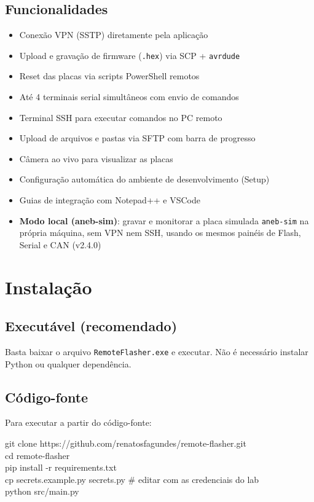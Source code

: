 \documentclass[12pt,a4paper]{article}
\begin{document}
\subsection{Funcionalidades}

\begin{itemize}[nosep]
  \item Conexão VPN (SSTP) diretamente pela aplicação
  \item Upload e gravação de firmware (\texttt{.hex}) via SCP + \texttt{avrdude}
  \item Reset das placas via scripts PowerShell remotos
  \item Até 4 terminais serial simultâneos com envio de comandos
  \item Terminal SSH para executar comandos no PC remoto
  \item Upload de arquivos e pastas via SFTP com barra de progresso
  \item Câmera ao vivo para visualizar as placas
  \item Configuração automática do ambiente de desenvolvimento (Setup)
  \item Guias de integração com Notepad++ e VSCode
  \item \textbf{Modo local (aneb-sim)}: gravar e monitorar a placa
        simulada \texttt{aneb-sim} na própria máquina, sem VPN nem SSH,
        usando os mesmos painéis de Flash, Serial e CAN (v2.4.0)
\end{itemize}

\section{Instalação}

\subsection{Executável (recomendado)}

Basta baixar o arquivo \texttt{RemoteFlasher.exe} e executar. Não é necessário instalar Python ou qualquer dependência.

\subsection{Código-fonte}

Para executar a partir do código-fonte:

\begin{codigobox}
git clone https://github.com/renatosfagundes/remote-flasher.git\\
cd remote-flasher\\
pip install -r requirements.txt\\
cp secrets.example.py secrets.py   \# editar com as credenciais do lab\\
python src/main.py
\end{codigobox}
\end{document}
